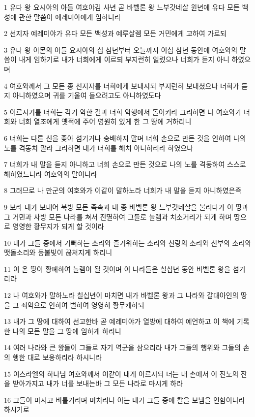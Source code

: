 \par 1 유다 왕 요시야의 아들 여호야김 사년 곧 바벨론 왕 느부갓네살 원년에 유다 모든 백성에 관한 말씀이 예레미야에게 임하니라
\par 2 선지자 예레미야가 유다 모든 백성과 예루살렘 모든 거민에게 고하여 가로되
\par 3 유다 왕 아몬의 아들 요시야의 십 삼년부터 오늘까지 이십 삼년 동안에 여호와의 말씀이 내게 임하기로 내가 너희에게 이르되 부지런히 일렀으나 너희가 듣지 아니 하였으며
\par 4 여호와께서 그 모든 종 선지자를 너희에게 보내시되 부지런히 보내셨으나 너희가 듣지 아니하였으며 귀를 기울여 들으려고도 아니하였도다
\par 5 이르시기를 너희는 각기 악한 길과 너희 악행에서 돌이키라 그리하면 나 여호와가 너희와 너희 열조에게 옛적에 주어 영원히 있게 한 그 땅에 거하리니
\par 6 너희는 다른 신을 좇아 섬기거나 숭배하지 말며 너희 손으로 만든 것을 인하여 나의 노를 격동치 말라 그리하면 내가 너희를 해치 아니하리라 하였으나
\par 7 너희가 내 말을 듣지 아니하고 너희 손으로 만든 것으로 나의 노를 격동하여 스스로 해하였느니라 여호와의 말이니라
\par 8 그러므로 나 만군의 여호와가 이같이 말하노라 너희가 내 말을 듣지 아니하였은즉
\par 9 보라 내가 보내어 북방 모든 족속과 내 종 바벨론 왕 느부갓네살을 불러다가 이 땅과 그 거민과 사방 모든 나라를 쳐서 진멸하여 그들로 놀램과 치소거리가 되게 하며 땅으로 영영한 황무지가 되게 할 것이라
\par 10 내가 그들 중에서 기뻐하는 소리와 즐거워하는 소리와 신랑의 소리와 신부의 소리와 맷돌소리와 등불빛이 끊쳐지게 하리니
\par 11 이 온 땅이 황폐하여 놀램이 될 것이며 이 나라들은 칠십년 동안 바벨론 왕을 섬기리라
\par 12 나 여호와가 말하노라 칠십년이 마치면 내가 바벨론 왕과 그 나라와 갈대아인의 땅을 그 죄악으로 인하여 벌하여 영영히 황무케하되
\par 13 내가 그 땅에 대하여 선고한바 곧 예레미야가 열방에 대하여 예언하고 이 책에 기록한 나의 모든 말을 그 땅에 임하게 하리니
\par 14 여러 나라와 큰 왕들이 그들로 자기 역군을 삼으리라 내가 그들의 행위와 그들의 손의 행한 대로 보응하리라 하시니라
\par 15 이스라엘의 하나님 여호와께서 이같이 내게 이르시되 너는 내 손에서 이 진노의 잔을 받아가지고 내가 너를 보내는바 그 모든 나라로 마시게 하라
\par 16 그들이 마시고 비틀거리며 미치리니 이는 내가 그들 중에 칼을 보냄을 인함이니라 하시기로
